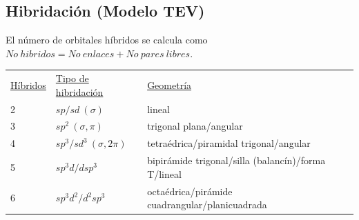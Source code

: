 \documentclass[12pt]{article}
\begin{document}
\subsection{Hibridación (Modelo TEV)}
El número de orbitales híbridos se calcula como $No \ hibridos=No \ enlaces + No \ pares \ libres$.\\
\begin{table}[h!]
\begin{tabular}{lll}
\underline{Híbridos} & \underline{Tipo de hibridación} & \underline{Geometría}                                     \\
2                 & $sp/sd\ (\sigma)$                   & lineal                                              \\
3                 & $sp^2\ (\sigma, \pi)$                    & trigonal plana/angular                              \\
4                 & $sp^3/sd^3\ (\sigma, 2\pi)$               & tetraédrica/piramidal trigonal/angular              \\
5                 & $sp^3d/dsp^3$             & bipirámide trigonal/silla (balancín)/forma T/lineal \\
6                 & $sp^3d^2/d^2sp^3$         & octaédrica/pirámide cuadrangular/planicuadrada     
\end{tabular}
\end{table}
\end{document}
